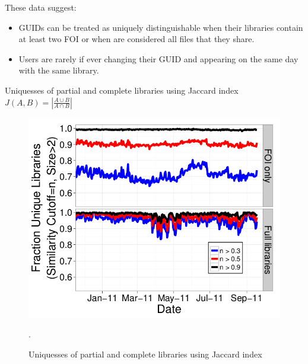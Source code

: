 \documentclass[notes]{beamer}
\begin{document}
\begin{frame}

\begin{block}{These data suggest:}

\begin{itemize}

\item[\checkmark]GUIDs can be treated as uniquely distinguishable when their libraries contain at least two FOI or when are considered all files that they share. 

\item[\checkmark] Users are rarely if ever changing their GUID and appearing on the same day with the same library. 

\end{itemize}

\end{block}

\end{frame}

\begin{frame}

\begin{block}{Uniquesses of partial and complete libraries using Jaccard index $ J(A,B)=\left| \frac{A\cup B} {A\cap B} \right|$}

\begin{figure}[!htb]
\centering
\includegraphics[scale=0.25]{Libraries_unique}
\caption{Uniquesses of partial and complete libraries using Jaccard index}.
\label{fig:Libraries_unique}
\end{figure}

\end{block}

\end{frame}
\end{document}

